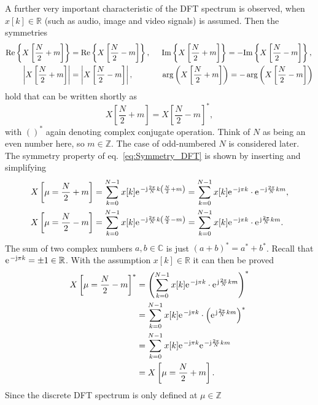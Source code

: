 \documentclass[11pt,a4paper,DIV=12]{scrartcl}
\begin{document}
A further very important characteristic of the DFT spectrum is observed,
when $x[k]\in\mathbb{R}$ (such as audio, image and video signals) is assumed.
%
Then the symmetries
\begin{align}
\text{Re}\left\{X\left[\frac{N}{2}+m\right]\right\}&=\text{Re}\left\{X\left[\frac{N}{2}-m\right]\right\}, \hspace{5mm} \text{Im}\left\{X\left[\frac{N}{2}+m\right]\right\}=-\text{Im}\left\{X\left[\frac{N}{2}-m\right]\right\},\\
\left|X\left[\frac{N}{2}+m\right]\right|&=\left|X\left[\frac{N}{2}-m\right]\right|, \hspace{1.3cm} \arg\left(X\left[\frac{N}{2}+m\right]\right)=-\arg\left(X\left[\frac{N}{2}-m\right]\right)
\end{align}
%
hold that can be written shortly as
%
\begin{equation}
X\left[\frac{N}{2}+m\right]=X\left[\frac{N}{2}-m\right]^*,
\label{eq:Symmetry_DFT}
\end{equation}
%
with $()^*$ again denoting complex conjugate operation.
%
Think of $N$ as being an even number here, so $m\in \mathbb{Z}$.
%
The case of odd-numbered $N$ is considered later.
%
The symmetry property of eq.~\eqref{eq:Symmetry_DFT} is shown by inserting and
simplifying
\begin{align}
X\left[\mu=\frac{N}{2}+m\right]&=\sum_{k=0}^{N-1}x[k]\e^{-\im\frac{2\pi}{N}k{\left(\frac{N}{2}+m\right)}}=\sum_{k=0}^{N-1}x[k]\e^{-\im\pi k}\cdot\e^{-\im\frac{2\pi}{N}km},\\
X\left[\mu=\frac{N}{2}-m\right]&=\sum_{k=0}^{N-1}x[k]\e^{-\im\frac{2\pi}{N}k{\left(\frac{N}{2}-m\right)}}=\sum_{k=0}^{N-1}x[k]\e^{-\im\pi k}\cdot\e^{\im\frac{2\pi}{N}km}.
\end{align}
%
The sum of two complex numbers $a,b\in\mathbb{C}$ is just $(a+b)^*=a^*+b^*$.
Recall that $\e^{-\im\pi k}=\pm 1\in\mathbb{R}$.
%
With the assumption $x[k]\in\mathbb{R}$ it can then be proved
\begin{align}
X\left[\mu=\frac{N}{2}-m\right]^*&=\left(\sum_{k=0}^{N-1}x[k]\e^{-\im\pi k}\cdot\e^{\im\frac{2\pi}{N}km}\right)^*\\
&=\sum_{k=0}^{N-1}x[k]\e^{-\im\pi k}\cdot\left(\e^{\im\frac{2\pi}{N}km}\right)^*\\
&=\sum_{k=0}^{N-1}x[k]\e^{-\im\pi k}\e^{-\im\frac{2\pi}{N}km}\\
&=X\left[\mu=\frac{N}{2}+m\right].
\end{align}
%
Since the discrete DFT spectrum is only defined at $\mu\in\mathbb{Z}$
\end{document}
